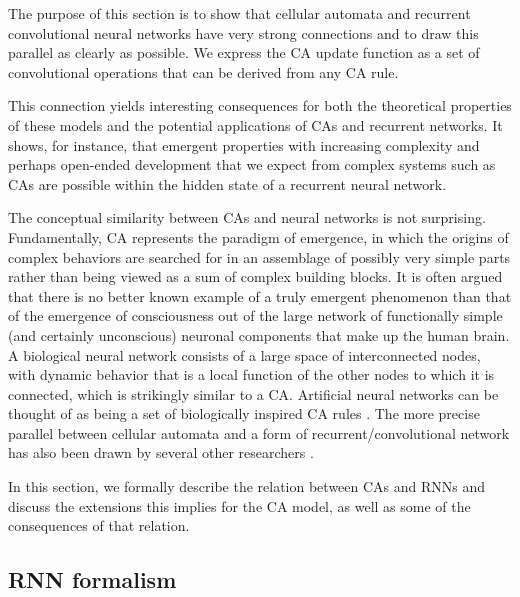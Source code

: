 The purpose of this section is to show that cellular automata and recurrent
convolutional neural networks have very strong connections and to draw this
parallel as clearly as possible. We express the \ac{CA} update function as a set
of convolutional operations that can be derived from any \ac{CA} rule.

This connection yields interesting consequences for both the theoretical
properties of these models and the potential applications of \acp{CA} and
recurrent networks. It shows, for instance, that emergent properties with
increasing complexity and perhaps open-ended development that we expect from
complex systems such as \acp{CA} are possible within the hidden state of a
recurrent neural network.

The conceptual similarity between \acp{CA} and neural networks is not surprising. 
Fundamentally, \ac{CA} represents the paradigm of emergence, in which
the origins of complex behaviors are searched for in an assemblage of possibly
very simple parts rather than being viewed as a sum of complex building blocks. It is
often argued that there is no better known example of a truly emergent
phenomenon than that of the emergence of consciousness out of the large network
of functionally simple (and certainly unconscious) neuronal components that make
up the human brain. A biological neural network consists of a
large space of interconnected nodes, with dynamic behavior that is a local
function of the other nodes to which it is connected, which is strikingly similar
to a \ac{CA}. Artificial neural networks can
be thought of as being a set of biologically inspired CA rules
\parencite{ilachinskiCellularAutomataDiscrete2001}. The more precise parallel
between cellular automata and a form of recurrent/convolutional network has also
been drawn by several other researchers
\parencite{wulffLearningCellularAutomaton1993,
  gilpinCellularAutomataConvolutional2018,
  mordvintsevGrowingNeuralCellular2020}.

In this section, we formally describe the relation between \acp{CA} and \acp{RNN}
and discuss the extensions this implies for the \ac{CA} model, as well as some of
the consequences of that relation.

\subsection{RNN formalism}

